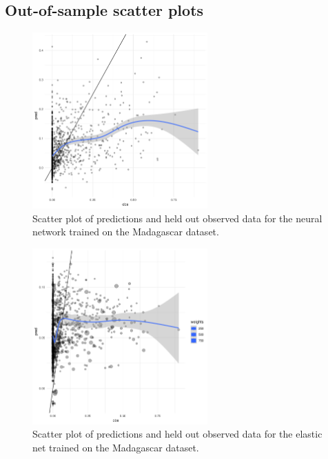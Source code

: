 \documentclass[review]{elsarticle}
\begin{document}
\clearpage
\subsection{Out-of-sample scatter plots}


\begin{figure}[h!]
  \centering
  \includegraphics[width=0.6\textwidth]{figs/SI/nnet_obspred_mdg.png}
\caption{
  Scatter plot of predictions and held out observed data for the neural network trained on the Madagascar dataset.
}

\end{figure}



\begin{figure}[h!]
  \centering
  \includegraphics[width=0.6\textwidth]{figs/SI/enet_obspred_mdg.png}
\caption{
  Scatter plot of predictions and held out observed data for the elastic net trained on the Madagascar dataset.
}

\end{figure}
\end{document}
